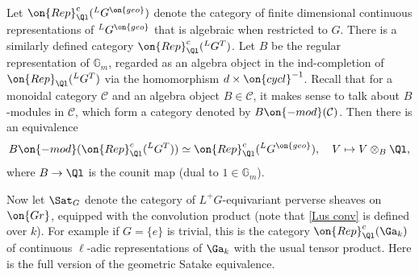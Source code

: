 \documentclass[]{pcmi}
\theoremstyle{plain}
\theoremstyle{remark}
\theoremstyle{definition}
\newcommand{\bG}{{\mathbb G}}
\newcommand{\mC}{{\mathcal C}}
\newcommand{\Gr}{{\on{Gr}}}
\begin{document}
Let $\on{Rep}^c_{\Ql}({^L}G^{\on{geo}})$ denote the category of finite dimensional continuous representations of ${^L}G^{\on{geo}}$ that is algebraic when restricted to $\hat G$.  There is a similarly defined category  $\on{Rep}^c_{\Ql}({^L}G^T)$.  Let $B$ be the regular representation of $\bG_m$, regarded as an algebra object in the ind-completion of $\on{Rep}_{\Ql}({^L}G^T)$ via the homomorphism $d\times \on{cycl}^{-1}$. Recall that for a monoidal category $\mC$ and an algebra object $B\in \mC$, it makes sense to talk about $B$-modules in $\mC$, which form a category denoted by $B\on{-mod}(\mC)$.
Then there is an equivalence
\[B\on{-mod}(\on{Rep}^c_{\Ql}({^L}G^T))\simeq \on{Rep}^c_{\Ql}({^L}G^{\on{geo}}),\quad V\mapsto V\otimes_B\Ql,\]
where $B\to \Ql$ is the counit map (dual to $1\in \bG_m$).




Now let $\Sat_G$ denote the category of $L^+G$-equivariant perverse sheaves on $\Gr$, equipped with the convolution product (note that \eqref{Lus conv} is defined over $k$). For example if $G=\{e\}$ is trivial, this is the category $\on{Rep}^c_{\Ql}(\Ga_k)$ of continuous $\ell$-adic representations of $\Ga_k$ with the usual tensor product. 
Here is the full version of the geometric Satake equivalence.
\end{document}

